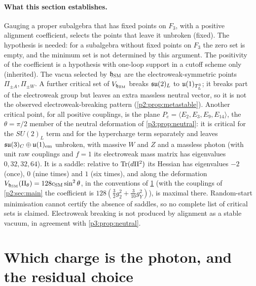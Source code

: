 \paragraph{What this section establishes.} Gauging a proper subalgebra that has fixed points on $F_3$, with a positive alignment coefficient, selects the
points that leave it unbroken (fixed). The hypothesis is needed: for a subalgebra without fixed points on $F_3$ the zero set is empty, and the
minimum set is not determined by this argument. The positivity of the coefficient is a hypothesis with one-loop support in a cutoff scheme only (inherited). The vacua selected by $\mathfrak h_{\rm SM}$ are
the electroweak-symmetric points $\Pi_{\pm A},\Pi_{\pm W}$. A further critical set of $V_{\mathfrak h_{\rm SM}}$ breaks $\mathfrak{su}(2)_L$ to $\mathfrak{u}(1)_{T^3_L}$; it breaks part of the electroweak
group but leaves an extra massless neutral vector, so it is not the observed electroweak-breaking pattern (\cref{p2:prop:metastable}). Another critical point, for all positive couplings, is the plane $P_e=\langle E_2,E_3,E_9,E_{14}\rangle$, the
$\theta=\pi/2$ member of the neutral deformation of \cref{p3:prop:neutral}: it is critical for the $SU(2)_L$ term and for the hypercharge term separately and
leaves $\mathfrak{su}(3)_C\oplus\mathfrak{u}(1)_{\rm em}$ unbroken, with massive $W$ and $Z$ and a massless photon (with unit raw couplings and $f=1$ its electroweak mass matrix
has eigenvalues $0,32,32,64$). It is a saddle: relative to $\operatorname{Tr}(d\Pi^2)$ its Hessian has eigenvalues $-2$ (once), $0$ (nine times) and $1$ (six times), and
along the deformation $V_{\mathfrak h_{\rm SM}}(\Pi_\theta)=128c_{\rm SM}\sin^2\theta$, in the conventions of \cref{p3:sec:main} (with the couplings of
\cref{p2:sec:main} the coefficient is $128(\tfrac32g_2^2+\tfrac3{10}g_Y^2)$), is maximal there. Random-start minimisation cannot certify the absence of
saddles, so no complete list of critical sets is claimed. Electroweak breaking is not produced by alignment as a stable vacuum, in agreement with
\cref{p3:prop:neutral}.


\section{Which charge is the photon, and the residual choice}
\label{p3:sec:main}

